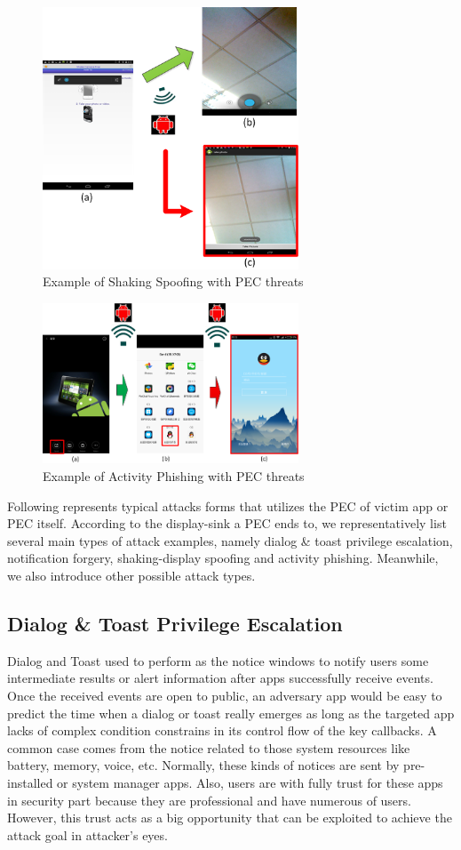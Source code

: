 \documentclass{sig-alternate-05-2015}
\begin{document}
\begin{figure}
\centering
\includegraphics[width = 3.0in]{pic4.png}
\caption{\label{}Example of Shaking Spoofing with PEC threats}
\end{figure}

\begin{figure}
\centering
\includegraphics[width = 3.0in]{pic5.png}
\caption{\label{}Example of Activity Phishing with PEC threats}
\end{figure}

Following represents typical attacks forms that utilizes the PEC of victim app or PEC itself. According to the display-sink a PEC ends to, we representatively list several main types of attack examples, namely dialog \& toast privilege escalation, notification forgery, shaking-display spoofing and activity phishing. Meanwhile, we also introduce other possible attack types.
\subsection{Dialog \& Toast Privilege Escalation}
Dialog and Toast used to perform as the notice windows to notify users some intermediate results or alert information  after apps successfully receive events. Once the received events are open to public, an adversary app would be easy to predict the time when a dialog or toast really emerges as long as the targeted app lacks of complex condition constrains in its control flow of the key callbacks. A common case comes from the notice related to those system resources like battery, memory, voice, etc. Normally, these kinds of notices are sent by pre-installed or system manager apps. Also, users are with fully trust for these apps in security part because they are professional and have numerous of users. However, this trust acts as a big opportunity that can be exploited to achieve the attack goal in attacker's eyes.
\end{document}
